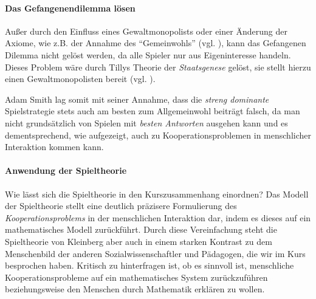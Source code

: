 \paragraph{Das Gefangenendilemma lösen}

Außer durch den Einfluss eines Gewaltmonopolists oder einer Änderung der Axiome, wie z.B. der Annahme des ``Gemeinwohls'' (vgl. \citeauthor{rousseau-1762}), kann das Gefangenen Dilemma nicht gelöst werden, da alle Spieler nur aus Eigeninteresse handeln.
Dieses Problem wäre durch Tillys Theorie der \emph{Staatsgenese} gelöst, sie stellt hierzu einen Gewaltmonopolisten bereit (vgl. \citeauthor{Tilly-1985-aa}).

Adam Smith lag somit mit seiner Annahme, dass die \emph{streng dominante} Spielstrategie stets auch am besten zum Allgemeinwohl beiträgt falsch, da man nicht grundsätzlich von Spielen mit \emph{besten Antworten} ausgehen kann und es dementsprechend, wie aufgezeigt, auch zu Kooperationsproblemen in menschlicher Interaktion kommen kann.


\paragraph{Anwendung der Spieltheorie}

Wie lässt sich die Spieltheorie in den Kurszusammenhang einordnen?
Das Modell der Spieltheorie stellt eine deutlich präzisere Formulierung des \emph{Kooperationsproblems} in der menschlichen Interaktion dar, indem es dieses auf ein mathematisches Modell zurückführt.
Durch diese Vereinfachung steht die Spieltheorie von Kleinberg aber auch in einem starken Kontrast zu dem Menschenbild der anderen Sozialwissenschaftler und Pädagogen, die wir im Kurs besprochen haben.
Kritisch zu hinterfragen ist, ob es sinnvoll ist, menschliche Kooperationsprobleme auf ein mathematisches System zurückzuführen beziehungsweise den Menschen durch Mathematik erklären zu wollen.
